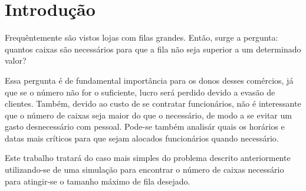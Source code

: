 \chapter{Introdução}
Frequêntemente são vistos lojas com filas grandes. Então, surge
a pergunta: quantos caixas são necessários para que a fila não
seja superior a um determinado valor?

Essa pergunta é de fundamental importância para os donos desses
comércios, já que se o número não for o suficiente, lucro será
perdido devido a evasão de clientes. Também, devido ao custo
de se contratar funcionários, não é interessante que o número
de caixas seja maior do que o necessário, de modo a se evitar
um gasto desnecessário com pessoal. Pode-se também analisár
quais os horários e datas mais críticos para que sejam alocados
funcionários quando necessário.

Este trabalho tratará do caso mais simples do problema descrito
anteriormente utilizando-se de uma simulação para encontrar
o número de caixas necessário para atingir-se o tamanho máximo
de fila desejado.

